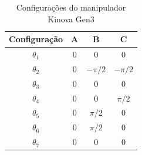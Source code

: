 \documentclass[a4paper,11pt]{article}
\theoremstyle{mytheor}
\begin{document}
\begin{table}[!ht]
\centering
\caption{Configurações do manipulador Kinova Gen3}
\label{tab:ex1_configuracoes}
\begin{tabular}{|c|c|c|c|}
\hline
Configuração & A & B & C  \\ \hline
$\theta_1$ & $0$ & $0$ & $0$ \\ \hline
$\theta_2$ & $0$ & $-\pi/2$ & $-\pi/2$ \\ \hline
$\theta_3$ & $0$ & $0$ & $0$ \\ \hline
$\theta_4$ & $0$ & $0$ & $\pi/2$ \\ \hline
$\theta_5$ & $0$ & $\pi/2$ & $0$ \\ \hline
$\theta_6$ & $0$ & $\pi/2$ & $0$ \\ \hline
$\theta_7$ & $0$ & $0$ & $0$ \\ \hline
\end{tabular}
\end{table}
\end{document}
